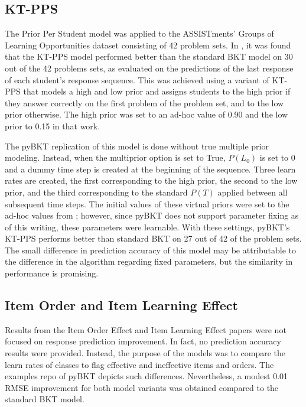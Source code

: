 \documentclass{edm_article}
\begin{document}
\subsection{KT-PPS}
The Prior Per Student model was applied to the ASSISTments' Groups of Learning Opportunities dataset \cite{feng2008can} consisting of 42 problem sets. 
In \citeauthor{pardos2010modeling}, it was found that the KT-PPS model performed better than the standard BKT model on 30 out of the 42 problems sets, as evaluated on the predictions of the last response of each student's response sequence. This was achieved using a variant of KT-PPS that models a high and low prior and assigns students to the high prior if they answer correctly on the first problem of the problem set, and to the low prior otherwise. The high prior was set to an ad-hoc value of 0.90 and the low prior to 0.15 in that work. 

The pyBKT replication of this model is done without true multiple prior modeling. Instead, when the multiprior option is set to True, $P(L_0)$ is set to 0 and a dummy time step is created at the beginning of the sequence. Three learn rates are created, the first corresponding to the high prior, the second to the low prior, and the third corresponding to the standard $P(T)$ applied between all subsequent time steps. The initial values of these virtual priors were set to the ad-hoc values from \cite{pardos2010modeling}; however, since pyBKT does not support parameter fixing as of this writing, these parameters were learnable. With these settings, pyBKT's KT-PPS performs better than standard BKT on 27 out of 42 of the problem sets. The small difference in prediction accuracy of this model may be attributable to the difference in the algorithm regarding fixed parameters, but the similarity in performance is promising.

\subsection{Item Order and Item Learning Effect}
Results from the Item Order Effect \cite{pardos2009determining} and Item Learning Effect \cite{pardos2009detecting} papers were not focused on response prediction improvement. In fact, no prediction accuracy results were provided. Instead, the purpose of the models was to compare the learn rates of classes to flag effective and ineffective items and orders. The examples repo of pyBKT depicts such differences. Nevertheless, a modest 0.01 RMSE improvement for both model variants was obtained compared to the standard BKT model. 
\end{document}
